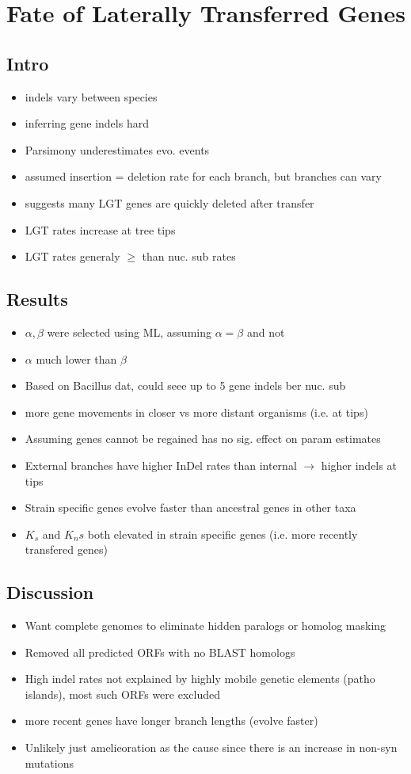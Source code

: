 \documentclass[10pt,letter]{article}
\begin{document}
\section*{Fate of Laterally Transferred Genes \cite{fate}}
\subsection*{Intro}
\begin{itemize}
    \item indels vary between species
    \item inferring gene indels hard
    \item Parsimony underestimates evo. events
    \item assumed insertion = deletion rate for each branch, but branches can vary
    \item suggests many LGT genes are quickly deleted after transfer
    \item LGT rates increase at tree tips
    \item LGT rates generaly $\geq$ than nuc. sub rates
\end{itemize}
\subsection*{Results}
\begin{itemize}
    \item $\alpha,\beta$ were selected using ML, assuming $\alpha = \beta$ and not
    \item $\alpha$ much lower than $\beta$
    \item Based on Bacillus dat, could seee up to 5 gene indels ber nuc. sub
    \item more gene movements in closer vs more distant organisms (i.e. at tips)
    \item Assuming genes cannot be regained has no sig. effect on param estimates
    \item External branches have higher InDel rates than internal $\to$ higher indels at tips
    \item Strain specific genes evolve faster than ancestral genes in other taxa
    \item $K_s$ and $K_ns$ both elevated in strain specific genes (i.e. more recently transfered genes)
\end{itemize}
\subsection*{Discussion}
\begin{itemize}
    \item Want complete genomes to eliminate hidden paralogs or homolog masking
    \item Removed all predicted ORFs with no BLAST homologs
    \item High indel rates not explained by highly mobile genetic elements (patho islands), most such ORFs were excluded
    \item more recent genes have longer branch lengths (evolve faster)
    \item Unlikely just amelieoration as the cause since there is an increase in non-syn mutations
\end{itemize}
\end{document}
